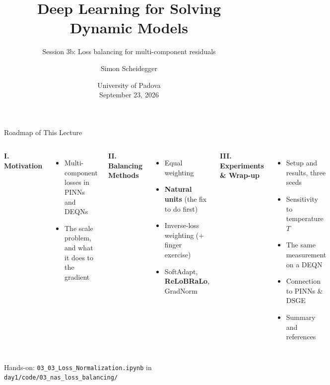 \documentclass[aspectratio=169,11pt]{beamer}
\title[Loss balancing -- Padova 2026]%
{Deep Learning for Solving Dynamic Models}
\subtitle{Session 3b: Loss balancing for multi-component residuals}
\author{Simon Scheidegger}
\institute[HEC Lausanne]{HEC, University of Lausanne}
\date{University of Padova\\September 23, 2026}
\begin{document}
\newcommand{\exercisepause}{%
  \tikz[baseline=(X.base)]{\node[fill=darkgreen!80!black, text=white,
  rounded corners=2pt, inner sep=3pt, font=\scriptsize\bfseries](X){PAUSE, 5 min};}}



{
\begin{frame}
\titlepage
\end{frame}
}

\begin{frame}{Roadmap of This Lecture}
\begin{columns}[T]
\textbf{I. Motivation}
\begin{itemize}
    \item Multi-component losses in PINNs and DEQNs
    \item The scale problem, and what it does to the gradient
\end{itemize}

\vspace{0.2em}
\textbf{II. Balancing Methods}
\begin{itemize}
    \item Equal weighting
    \item \textbf{Natural units} (the fix to do first)
    \item Inverse-loss weighting (+ finger exercise)
    \item SoftAdapt, \textbf{ReLoBRaLo}, GradNorm
\end{itemize}

\textbf{III. Experiments \& Wrap-up}
\begin{itemize}
    \item Setup and results, three seeds
    \item Sensitivity to temperature $T$
    \item The same measurement on a DEQN
    \item Connection to PINNs \& DSGE
    \item Summary and references
\end{itemize}
\end{columns}

\vspace{-0.3em}
\begin{center}
{\scriptsize Hands-on: \texttt{03\_03\_Loss\_Normalization.ipynb} in \texttt{day1/code/03\_nas\_loss\_balancing/}}
\end{center}
\end{frame}
\end{document}
